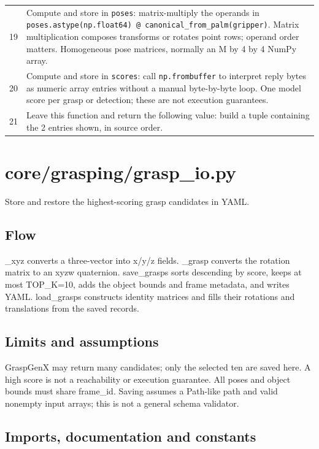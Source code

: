 \documentclass[11pt,a4paper]{book}
\begin{document}
\begin{longtable}{r p{}}
19 & Compute and store in \texttt{poses}: matrix-multiply the operands in \texttt{poses.astype(np.float64) @ canonical\_from\_palm(gripper)}. Matrix multiplication composes transforms or rotates point rows; operand order matters. Homogeneous pose matrices, normally an M by 4 by 4 NumPy array. \\

20 & Compute and store in \texttt{scores}: call \texttt{np.frombuffer} to interpret reply bytes as numeric array entries without a manual byte-by-byte loop. One model score per grasp or detection; these are not execution guarantees. \\

21 & Leave this function and return the following value: build a tuple containing the 2 entries shown, in source order. \\

\end{longtable}

\chapter{core/grasping/grasp\_io.py}

Store and restore the highest-scoring grasp candidates in YAML.

\section*{Flow}

\_xyz converts a three-vector into x/y/z fields. \_grasp converts the rotation matrix to an xyzw quaternion. save\_grasps sorts descending by score, keeps at most TOP\_K=10, adds the object bounds and frame metadata, and writes YAML. load\_grasps constructs identity matrices and fills their rotations and translations from the saved records.

\section*{Limits and assumptions}

GraspGenX may return many candidates; only the selected ten are saved here. A high score is not a reachability or execution guarantee. All poses and object bounds must share frame\_id. Saving assumes a Path-like path and valid nonempty input arrays; this is not a general schema validator.

\section{Imports, documentation and constants}
\end{document}
